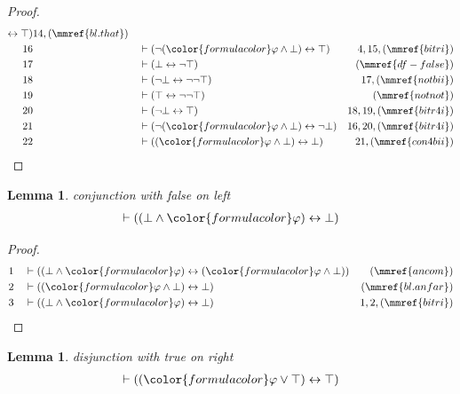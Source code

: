 \documentclass{article}
\theoremstyle{plain}
\newtheorem{lemma}{Theorem}[section]
\newtheorem{lemma}[theorem]{Lemma}
\begin{document}
\begin{proof}
\begin{align}
      \leftrightarrow \top )&14,(\mmref{bl.that})\notag
  \\ 16 && & \vdash ( \lnot ( {\color{formulacolor}\varphi} \wedge \bot )
      \leftrightarrow \top )&4,15,(\mmref{bitri})\notag
  \\ 17 && & \vdash ( \bot \leftrightarrow \lnot \top
      )&(\mmref{df-false})\notag
  \\ 18 && & \vdash ( \lnot \bot \leftrightarrow \lnot \lnot \top
      )&17,(\mmref{notbii})\notag
  \\ 19 && & \vdash ( \top \leftrightarrow \lnot \lnot \top
      )&(\mmref{notnot})\notag
  \\ 20 && & \vdash ( \lnot \bot \leftrightarrow \top
      )&18,19,(\mmref{bitr4i})\notag
  \\ 21 && & \vdash ( \lnot ( {\color{formulacolor}\varphi} \wedge \bot )
      \leftrightarrow \lnot \bot
      )&16,20,(\mmref{bitr4i})\notag
  \\ 22 && & \vdash ( ( {\color{formulacolor}\varphi} \wedge \bot )
      \leftrightarrow \bot )&21,(\mmref{con4bii})\notag
\end{align}
\end{proof}

\begin{lemma} conjunction with false  on left
\begin{align}
\vdash ( ( \bot \wedge {\color{formulacolor}\varphi} ) \leftrightarrow \bot
    )\label{bl.anfal}
\end{align}
\end{lemma}

\begin{proof}
\begin{align}
  1 && & \vdash ( ( \bot \wedge {\color{formulacolor}\varphi} ) \leftrightarrow
      ( {\color{formulacolor}\varphi} \wedge \bot )
      )&(\mmref{ancom})\notag
  \\ 2 && & \vdash ( ( {\color{formulacolor}\varphi} \wedge \bot )
      \leftrightarrow \bot )&(\mmref{bl.anfar})\notag
  \\ 3 && & \vdash ( ( \bot \wedge {\color{formulacolor}\varphi} )
      \leftrightarrow \bot )&1,2,(\mmref{bitri})\notag
\end{align}
\end{proof}

\begin{lemma} disjunction with true  on right
\begin{align}
\vdash ( ( {\color{formulacolor}\varphi} \vee \top ) \leftrightarrow \top
    )\label{bl.ortrr}
\end{align}
\end{lemma}
\end{document}
